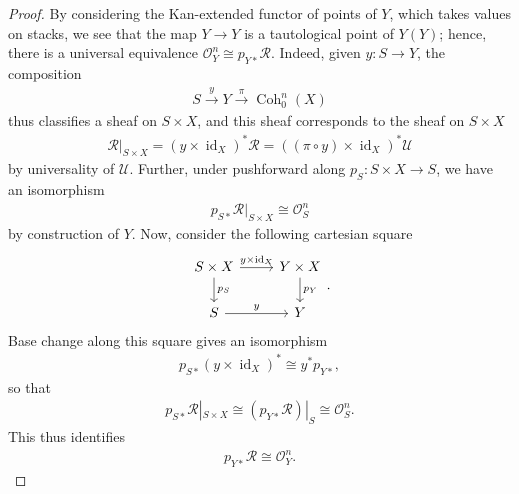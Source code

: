 \documentclass{article}
\numberwithin{equation}{section}
\theoremstyle{quest}
\theoremstyle{definition}
\theoremstyle{remark}
\DeclareMathOperator{\id}{id}
\DeclareMathOperator{\Coh}{Coh}
\begin{document}
\begin{proof}
	By considering the Kan-extended functor of points of $Y$, which takes values on stacks, we see that the map $Y\to Y$ is a tautological point of $Y(Y) $; hence, there is a universal equivalence $\mathscr{O}^n_Y\cong p_{Y*}\mathscr{R}$. Indeed, given $y:S\to Y$, the composition
	\begin{align*}
		S\xrightarrow{y} Y\xrightarrow{\pi} \Coh^n_0(X)
	\end{align*} 
	thus classifies a sheaf on $S \times X$, and this sheaf corresponds to the sheaf on $S\times X$
	\begin{align*}
		 \mathscr{R} | _{S\times X}=(y\times \id_X)^*\mathscr{R}=((\pi\circ y)\times \id_X)^*\mathscr{U}
	\end{align*} 
	by universality of $\mathscr{U}$. Further, under pushforward along $p_S:S\times X\to S$, we have an isomorphism
	\begin{align*}
		p_{S*}\mathscr{R}|_{S\times X}\cong \mathscr{O}^n_S
	\end{align*} 
	by construction of $Y$. Now, consider the following cartesian square
	\[
	\begin{tikzcd}
		S\times X\arrow[r,"y\times \id_X"]\arrow[d,"p_S"]&Y\times X\arrow[d,"p_Y"]\\
		S\arrow[r,"y"]&Y
	\end{tikzcd}.
	\] 
Base change along this square gives an isomorphism
\begin{align*}
	p_{S*}(y\times \id_X)^*\cong y^*p_{Y*},
\end{align*} 
so that
\begin{align*}
p_{S*}\mathscr{R}|_{S\times X}\cong (p_{Y*}\mathscr{R})|_{S}\cong \mathscr{O}^n_S.
\end{align*} 
This thus identifies
\begin{align*}
	p_{Y*}\mathscr{R}\cong \mathscr{O}^n_Y.
\end{align*} 
\end{proof} 
\end{document}
